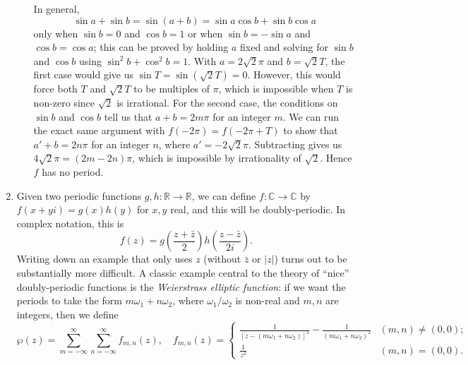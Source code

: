 \begin{enumerate}
\begin{enumerate}
\begin{equation*}
\end{equation*}
In general,
\begin{equation*}
\sin a + \sin b = \sin(a + b) = \sin a\cos b + \sin b\cos a
\end{equation*}
only when $\sin b = 0$ and $\cos b = 1$ or when $\sin b = -\sin a$ and $\cos b = \cos a$; this can be proved by holding $a$ fixed and solving for $\sin b$ and $\cos b$ using $\sin^2 b + \cos^2 b = 1$. With $a = 2\sqrt{2}\pi$ and $b = \sqrt{2}T$, the first case would give us $\sin T = \sin(\sqrt{2}T) = 0$. However, this would force both $T$ and $\sqrt{2}T$ to be multiples of $\pi$, which is impossible when $T$ is non-zero since $\sqrt{2}$ is irrational. For the second case, the conditions on $\sin b$ and $\cos b$ tell us that $a + b = 2m\pi$ for an integer $m$. We can run the exact same argument with $f(-2\pi) = f(-2\pi + T)$ to show that $a' + b = 2n\pi$ for an integer $n$, where $a' = -2\sqrt{2}\pi$. Subtracting gives us $4\sqrt{2}\pi = (2m - 2n)\pi$, which is impossible by irrationality of $\sqrt{2}$. Hence $f$ has no period.
\end{enumerate}
\item Given two periodic functions $g,h:\mathbb{R}\to\mathbb{R}$, we can define $f:\mathbb{C}\to\mathbb{C}$ by $f(x + yi) = g(x)h(y)$ for $x,y$ real, and this will be doubly-periodic. In complex notation, this is
\begin{equation*}
f(z) = g\left(\frac{z + \bar{z}}{2}\right)h\left(\frac{z - \bar{z}}{2i}\right).
\end{equation*}
Writing down an example that only uses $z$ (without $\bar{z}$ or $\lvert z\rvert$) turns out to be substantially more difficult. A classic example central to the theory of ``nice'' doubly-periodic functions is the \emph{Weierstrass elliptic function}: if we want the periods to take the form $m\omega_1 + n\omega_2$, where $\omega_1/\omega_2$ is non-real and $m,n$ are integers, then we define
\begin{equation*}
\wp(z) = \sum_{m = -\infty}^{\infty}\sum_{n = -\infty}^{\infty} f_{m,n}(z),\quad f_{m,n}(z) = \begin{cases} \frac{1}{[z - (m\omega_1 + n\omega_2)]^2} - \frac{1}{(m\omega_1 + n\omega_2)^2} & (m,n)\neq (0,0); \\ \frac{1}{z^2} & (m,n) = (0,0). \end{cases}
\end{equation*}
\end{enumerate}
